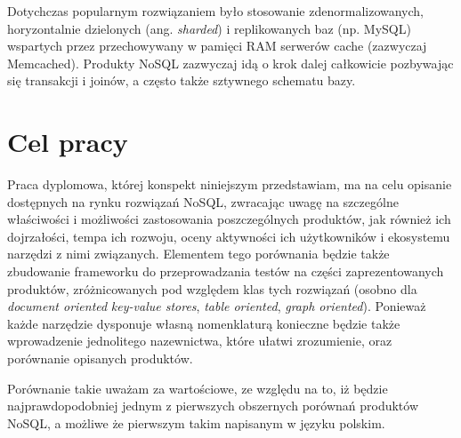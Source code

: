 Dotychczas popularnym rozwiązaniem było stosowanie zdenormalizowanych, horyzontalnie dzielonych (ang. \emph{sharded}) i replikowanych baz (np. MySQL) wspartych przez przechowywany w pamięci RAM serwerów cache (zazwyczaj Memcached). 
Produkty NoSQL zazwyczaj idą o krok dalej całkowicie pozbywając się transakcji i joinów, a często także sztywnego schematu bazy.

\section{Cel pracy}
Praca dyplomowa, której konspekt niniejszym przedstawiam, ma na celu opisanie dostępnych na rynku rozwiązań NoSQL, zwracając uwagę na szczególne właściwości i możliwości zastosowania poszczególnych produktów, jak również ich dojrzałości, tempa ich rozwoju, oceny aktywności ich użytkowników i ekosystemu narzędzi z nimi związanych. 
Elementem tego porównania będzie także zbudowanie frameworku do przeprowadzania testów na części zaprezentowanych produktów, zróżnicowanych pod względem klas tych rozwiązań (osobno dla \emph{document oriented} \emph{key-value stores}, \emph{table oriented}, \emph{graph oriented}).
Ponieważ każde narzędzie dysponuje własną nomenklaturą konieczne będzie także wprowadzenie jednolitego nazewnictwa, które ułatwi zrozumienie, oraz porównanie opisanych produktów.

Porównanie takie uważam za wartościowe, ze względu na to, iż będzie najprawdopodobniej jednym z pierwszych obszernych porównań produktów NoSQL, a możliwe że pierwszym takim napisanym w języku polskim.

